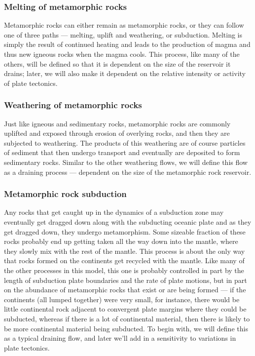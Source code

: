 \documentclass[11pt,letterpaper]{article}
\begin{document}
\subsubsection{Melting of metamorphic rocks}
Metamorphic rocks can either remain as metamorphic rocks, or they can follow one of three paths --- melting, uplift and weathering, or subduction. Melting is simply the result of continued heating and leads to the production of magma and thus new igneous rocks when the magma cools. This process, like many of the others, will be defined so that it is dependent on the size of the reservoir it drains; later, we will also make it dependent on the relative intensity or activity of plate tectonics. 

\subsubsection{Weathering of metamorphic rocks}
Just like igneous and sedimentary rocks, metamorphic rocks are commonly uplifted and exposed through erosion of overlying rocks, and then they are subjected to weathering. The products of this weathering are of course particles of sediment that then undergo transport and eventually are deposited to form sedimentary rocks. Similar to the other weathering flows, we will define this flow as a draining process --- dependent on the size of the metamorphic rock reservoir.

\subsubsection{Metamorphic rock subduction}
Any rocks that get caught up in the dynamics of a subduction zone may eventually get dragged down along with the subducting oceanic plate and as they get dragged down, they undergo metamorphism. Some sizeable fraction of these rocks probably end up getting taken all the way down into the mantle, where they slowly mix with the rest of the mantle. This process is about the only way that rocks formed on the continents get recycled with the mantle. Like many of the other processes in this model, this one is probably controlled in part by the length of subduction plate boundaries and the rate of plate motions, but in part on the abundance of metamorphic rocks that exist or are being formed --- if the continents (all lumped together) were very small, for instance, there would be little continental rock adjacent to convergent plate margins where they could be subducted, whereas if there is a lot of continental material, then there is likely to be more continental material being subducted. To begin with, we will define this as a typical draining flow, and later we'll add in a sensitivity to variations in plate tectonics.
\end{document}
